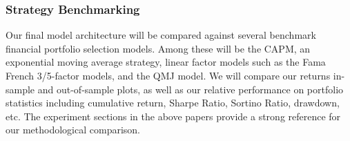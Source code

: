 \subsubsection{Strategy Benchmarking}

Our final model architecture will be compared against several benchmark financial portfolio selection 
models. Among these will be the CAPM, an exponential moving average strategy, linear factor models 
such as the Fama French 3/5-factor models, and the QMJ model. We will compare our returns 
in-sample and out-of-sample plots, as well as our relative performance on portfolio statistics 
including cumulative return, Sharpe Ratio, Sortino Ratio, drawdown, etc. The experiment sections 
in the above papers provide a strong reference for our methodological comparison.

